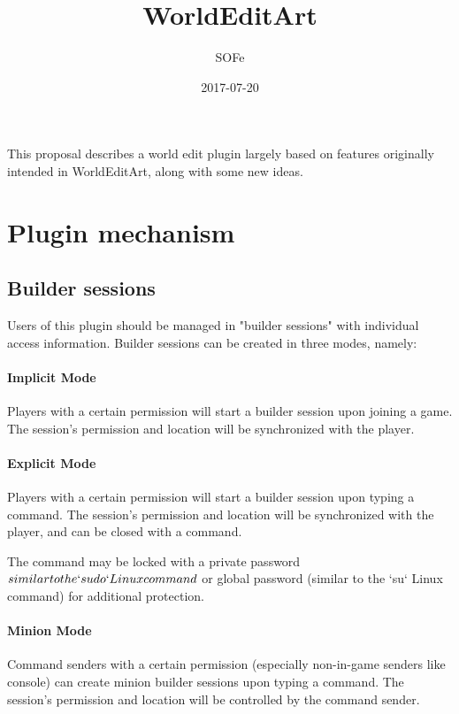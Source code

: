 \documentclass{article}
\title{WorldEditArt}
\date{2017-07-20}
\author{SOFe}
\begin{document}
	\maketitle
	This proposal describes a world edit plugin largely based on features originally intended in WorldEditArt, along with
	some new ideas.
	\section{Plugin mechanism}
		\subsection{Builder sessions}
			Users of this plugin should be managed in "builder sessions" with individual access information. Builder
			sessions can be created in three modes, namely:
			\paragraph{Implicit Mode}
				Players with a certain permission will start a builder session upon joining a game. The session's permission
				and location will be synchronized with the player.
			\paragraph{Explicit Mode}
				Players with a certain permission will start a builder session upon typing a command. The session's
				permission and location will be synchronized with the player, and can be closed with a command.

				The command may be locked with a private password \(similar to the `sudo` Linux command\) or global password
				(similar to the `su` Linux command) for additional protection.
			\paragraph{Minion Mode}
				Command senders with a certain permission (especially non-in-game senders like console) can create minion
				builder sessions upon typing a command. The session's permission and location will be controlled by the
				command sender.
\end{document}
